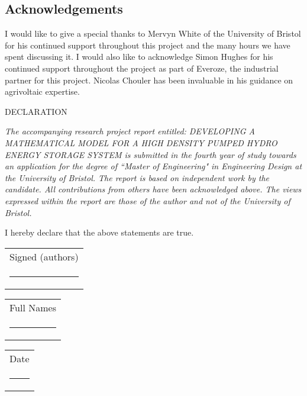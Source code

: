 \newpage
\begin{center}
    \section*{Acknowledgements}
\end{center}
I would like to give a special thanks to Mervyn White of the University of Bristol for his continued support throughout this project and the many hours we have spent discussing it. I would also like to acknowledge Simon Hughes for his continued support throughout the project as part of Everoze, the industrial partner for this project. Nicolas Chouler has been invaluable in his guidance on agrivoltaic expertise.  

\vspace{20mm}
\noindent DECLARATION
    \vspace{10mm}
    \begin{adjustwidth}{12mm}{12mm}
    
        \textit{The accompanying research project report entitled:  DEVELOPING A MATHEMATICAL MODEL FOR A HIGH DENSITY PUMPED HYDRO ENERGY STORAGE SYSTEM is submitted in the fourth year of study towards an application for the degree of ``Master of Engineering" in Engineering Design at the University of Bristol. The report is based on independent work by the candidate. All contributions from others have been acknowledged above. The views expressed within the report are those of the author and not of the University of Bristol.}
    
    \end{adjustwidth}

\vspace{20mm}
\noindent I hereby declare that the above statements are true.

\begin{center}
    \vfill%
    \begin{tabular}[t]{l}
        Signed (authors)\vspace{5mm}\\
        \rule{40em}{0.2pt}
    \end{tabular}%
    
    \vfill%
    \begin{tabular}[t]{l}
        Full Names \vspace{5mm}\\
        \rule{40em}{0.2pt}
    \end{tabular}%
    
    \vfill%
    \begin{tabular}[t]{l}
        Date \vspace{5mm}\\
        \rule{40em}{0.2pt}
    \end{tabular}%
    \vfill
\end{center}